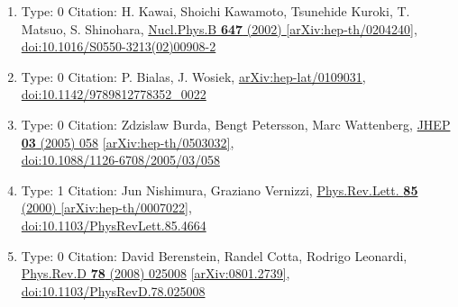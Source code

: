 \documentclass[a4paper,10pt]{article}
\begin{document}
\begin{enumerate}
\begin{enumerate}
  \item Type: 0 Citation: H. Kawai, Shoichi Kawamoto, Tsunehide Kuroki, T. Matsuo, S. Shinohara, \href{https://www.doi.org/10.1016/S0550-3213(02)00908-2}{Nucl.Phys.B {\bf 647} (2002) }  \href{https://arxiv.org/abs/hep-th/0204240}{[arXiv:hep-th/0204240]},\\\href{https://www.doi.org/10.1016/S0550-3213(02)00908-2}{doi:10.1016/S0550-3213(02)00908-2}
  \item Type: 0 Citation: P. Bialas, J. Wosiek, \href{https://arxiv.org/abs/hep-lat/0109031}{arXiv:hep-lat/0109031},\\\href{https://www.doi.org/10.1142/9789812778352_0022}{doi:10.1142/9789812778352\_0022}
  \item Type: 0 Citation: Zdzislaw Burda, Bengt Petersson, Marc Wattenberg, \href{https://www.doi.org/10.1088/1126-6708/2005/03/058}{JHEP {\bf 03} (2005) 058}  \href{https://arxiv.org/abs/hep-th/0503032}{[arXiv:hep-th/0503032]},\\\href{https://www.doi.org/10.1088/1126-6708/2005/03/058}{doi:10.1088/1126-6708/2005/03/058}
  \item Type: 1 Citation: Jun Nishimura, Graziano Vernizzi, \href{https://www.doi.org/10.1103/PhysRevLett.85.4664}{Phys.Rev.Lett. {\bf 85} (2000) }  \href{https://arxiv.org/abs/hep-th/0007022}{[arXiv:hep-th/0007022]},\\\href{https://www.doi.org/10.1103/PhysRevLett.85.4664}{doi:10.1103/PhysRevLett.85.4664}
  \item Type: 0 Citation: David Berenstein, Randel Cotta, Rodrigo Leonardi, \href{https://www.doi.org/10.1103/PhysRevD.78.025008}{Phys.Rev.D {\bf 78} (2008) 025008}  \href{https://arxiv.org/abs/0801.2739}{[arXiv:0801.2739]},\\\href{https://www.doi.org/10.1103/PhysRevD.78.025008}{doi:10.1103/PhysRevD.78.025008}

\end{enumerate}
\end{enumerate}
\end{document}

